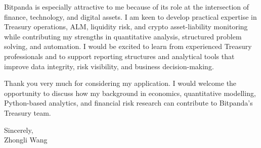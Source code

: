 \documentclass[11pt]{article}
\begin{document}
Bitpanda is especially attractive to me because of its role at the intersection of finance, technology, and digital assets. I am keen to develop practical expertise in Treasury operations, ALM, liquidity risk, and crypto asset-liability monitoring while contributing my strengths in quantitative analysis, structured problem solving, and automation. I would be excited to learn from experienced Treasury professionals and to support reporting structures and analytical tools that improve data integrity, risk visibility, and business decision-making.

Thank you very much for considering my application. I would welcome the opportunity to discuss how my background in economics, quantitative modelling, Python-based analytics, and financial risk research can contribute to Bitpanda's Treasury team.

\vspace{0.15cm}

\noindent Sincerely, \\[0.5cm]
\noindent Zhongli Wang
\end{document}
